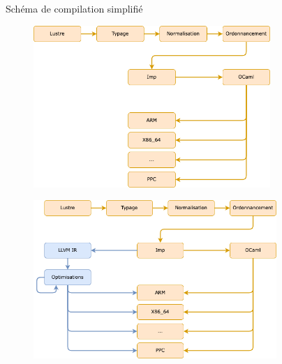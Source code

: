 \documentclass{beamer} %
\begin{document}
\begin{frame}{Schéma de compilation simplifié}
    \begin{overprint}
        \begin{figure}
            \centering
            \includegraphics[width=0.8\textwidth]{imgs/compilation0.png}
        \end{figure}
        \begin{figure}
            \centering
            \includegraphics[width=0.82\textwidth]{imgs/compilation1.png}
        \end{figure}
    \end{overprint}

\end{frame}
\end{document}
